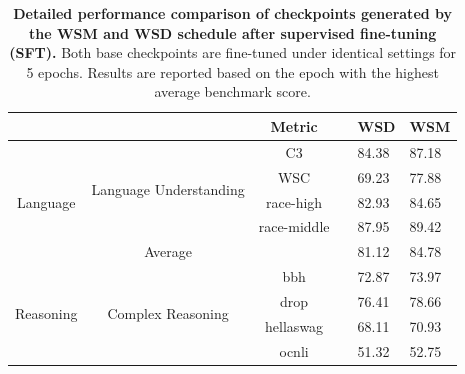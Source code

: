 \begin{table}[h]
\small
  \caption{\textbf{Detailed performance comparison of checkpoints generated by the WSM and WSD schedule after supervised fine-tuning (SFT).} Both base checkpoints are fine-tuned under identical settings for 5 epochs. Results are reported based on the epoch with the highest average benchmark score.}
  \label{inst_dataset_2}
  \centering
  \setlength{\tabcolsep}{5pt} %
\begin{tabular}{ccccll}
\toprule
\textbf{}                            & \textbf{}                                                                                       & \textbf{Metric}            &  & \textbf{WSD}   & \textbf{WSM}   \\ \midrule
\multirow{5}{*}{{Language}}   & \multirow{4}{*}{{Language Understanding}}                                                & C3                  &  & 84.38 & 87.18 \\
                                     &                                                                                                 & WSC                 &  &  69.23     & 77.88 \\
                                     &                                                                                                 & race-high           &  & 82.93 & 84.65 \\
                                     &                                                                                                 & race-middle         &  & 87.95 & 89.42 \\ \cmidrule{2-6} 
                                     & {Average}                                                                                &                     &  & 81.12 & 84.78 \\ \midrule
\multirow{11}{*}{{Reasoning}} & \multirow{10}{*}{{Complex Reasoning}}                                                    & bbh                 &  & 72.87 & 73.97 \\
                                     &                                                                                                 & drop                &  & 76.41 & 78.66 \\
                                     &                                                                                                 & hellaswag           &  & 68.11 & 70.93 \\
                                     &                                                                                                 & ocnli               &  & 51.32 & 52.75 \\

\end{tabular}
\end{table}

